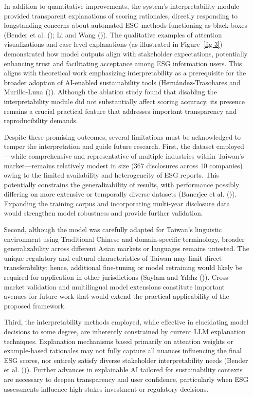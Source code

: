 \documentclass[
  12pt,
]{article}
\begin{document}
In addition to quantitative improvements, the system's interpretability
module provided transparent explanations of scoring rationales, directly
responding to longstanding concerns about automated ESG methods
functioning as black boxes (Bender et al.
(); Li and Wang
()). The qualitative examples of attention
visualizations and case-level explanations (as illustrated in
Figure~\ref{fig-3}) demonstrated how model outputs align with
stakeholder expectations, potentially enhancing trust and facilitating
acceptance among ESG information users. This aligns with theoretical
work emphasizing interpretability as a prerequisite for the broader
adoption of AI-enabled sustainability tools (Hernández-Trasobares and
Murillo-Luna ()). Although
the ablation study found that disabling the interpretability module did
not substantially affect scoring accuracy, its presence remains a
crucial practical feature that addresses important transparency and
reproducibility demands.

Despite these promising outcomes, several limitations must be
acknowledged to temper the interpretation and guide future research.
First, the dataset employed---while comprehensive and representative of
multiple industries within Taiwan's market---remains relatively modest
in size (367 disclosures across 10 companies) owing to the limited
availability and heterogeneity of ESG reports. This potentially
constrains the generalizability of results, with performance possibly
differing on more extensive or temporally diverse datasets (Banerjee et
al. ()). Expanding the training corpus
and incorporating multi-year disclosure data would strengthen model
robustness and provide further validation.

Second, although the model was carefully adapted for Taiwan's linguistic
environment using Traditional Chinese and domain-specific terminology,
broader generalizability across different Asian markets or languages
remains untested. The unique regulatory and cultural characteristics of
Taiwan may limit direct transferability; hence, additional fine-tuning
or model retraining would likely be required for application in other
jurisdictions (Saylam and Yıldız ()).
Cross-market validation and multilingual model extensions constitute
important avenues for future work that would extend the practical
applicability of the proposed framework.

Third, the interpretability methods employed, while effective in
elucidating model decisions to some degree, are inherently constrained
by current LLM explanation techniques. Explanation mechanisms based
primarily on attention weights or example-based rationales may not fully
capture all nuances influencing the final ESG scores, nor entirely
satisfy diverse stakeholder interpretability needs (Bender et al.
()). Further advances in explainable AI
tailored for sustainability contexts are necessary to deepen
transparency and user confidence, particularly when ESG assessments
influence high-stakes investment or regulatory decisions.
\end{document}
